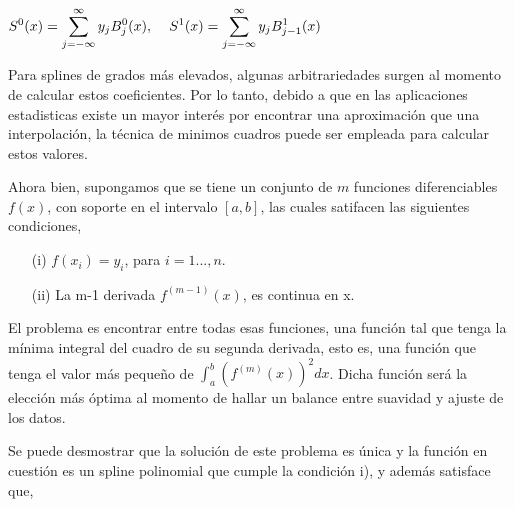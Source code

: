 \begin{center}

$\displaystyle{S^{0}(x) = \sum_{j=-\infty}^{\infty} y_{j} B^{0}_{j}(x),\hspace{0.4cm} S^{1}(x) = \sum_{j=-\infty}^{\infty} y_{j} B^{1}_{j-1}(x) }$
\end{center}

\vspace{0.5cm}

\hspace{0.4cm}Para splines de grados m\'as elevados, algunas arbitrariedades surgen al momento de calcular estos coeficientes. Por lo tanto, debido a que en las aplicaciones estadisticas existe un mayor inter\'es por encontrar una aproximaci\'on que una interpolaci\'on, la t\'ecnica de minimos cuadros puede ser empleada para calcular estos valores.


\vspace{0.5cm}

\hspace{0.4cm} Ahora bien, supongamos que se tiene un conjunto de $m$ funciones diferenciables $f(x)$, con soporte en el intervalo $[a,b]$, las cuales satifacen las siguientes condiciones,


\begin{itemize}
  \item[(i)] $f(x_{i})=y_{i}$, para $i=1...,n$.
  \item[(ii)] La m-1 derivada $f^{(m-1)}(x)$, es continua en x.
\end{itemize}

\hspace{0.4cm} El problema es encontrar entre todas esas funciones, una funci\'on tal que tenga la m\'inima integral del cuadro de su segunda derivada, esto es, una funci\'on que tenga el valor m\'as peque\~no de $\int_{a}^{b} (f^{(m)}(x))^2 dx$. Dicha funci\'on ser\'a la elecci\'on m\'as \'optima al momento de hallar un balance entre suavidad y ajuste de los datos.

\vspace{0.5cm}

\hspace{0.4cm} Se puede desmostrar que la soluci\'on de este problema es \'unica y la funci\'on en cuesti\'on es un spline polinomial que cumple la condici\'on i), y adem\'as satisface que,

